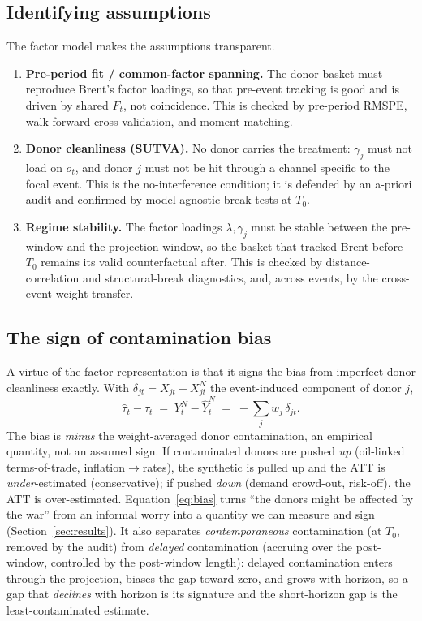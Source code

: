\documentclass[11pt,a4paper]{article}
\newcommand{\T}{\ensuremath{T_0}}
\begin{document}
\subsection{Identifying assumptions}
The factor model makes the assumptions transparent.
\begin{enumerate}
\item \textbf{Pre-period fit / common-factor spanning.} The donor basket must
reproduce Brent's factor loadings, so that pre-event tracking is good and is driven by
shared $F_t$, not coincidence. This is checked by pre-period RMSPE, walk-forward
cross-validation, and moment matching.
\item \textbf{Donor cleanliness (SUTVA).} No donor carries the treatment: $\gamma_j$
must not load on $o_t$, and donor $j$ must not be hit through a channel specific to the
focal event. This is the no-interference condition; it is defended by an a-priori
audit and confirmed by model-agnostic break tests at \T{}.
\item \textbf{Regime stability.} The factor loadings $\lambda,\gamma_j$ must be stable
between the pre-window and the projection window, so the basket that tracked Brent
before \T{} remains its valid counterfactual after. This is checked by
distance-correlation and structural-break diagnostics, and, across events, by the
cross-event weight transfer.
\end{enumerate}

\subsection{The sign of contamination bias}
A virtue of the factor representation is that it signs the bias from imperfect donor
cleanliness exactly. With $\delta_{jt}=X_{jt}-X_{jt}^N$ the event-induced component of
donor $j$,
\begin{equation}
\hat\tau_t-\tau_t \;=\; Y_t^N-\hat Y_t^N \;=\; -\sum_j w_j\,\delta_{jt}.
\label{eq:bias}
\end{equation}
The bias is \emph{minus} the weight-averaged donor contamination, an empirical
quantity, not an assumed sign. If contaminated donors are pushed \emph{up} (oil-linked
terms-of-trade, inflation$\to$rates), the synthetic is pulled up and the ATT is
\emph{under}-estimated (conservative); if pushed \emph{down} (demand crowd-out,
risk-off), the ATT is over-estimated. Equation~\eqref{eq:bias} turns ``the donors
might be affected by the war'' from an informal worry into a quantity we can measure
and sign (Section~\ref{sec:results}). It also separates \emph{contemporaneous} contamination
(at \T{}, removed by the audit) from \emph{delayed} contamination (accruing over the
post-window, controlled by the post-window length): delayed contamination enters
through the projection, biases the gap toward zero, and grows with horizon, so a
gap that \emph{declines} with horizon is its signature and the short-horizon gap is
the least-contaminated estimate.
\end{document}
